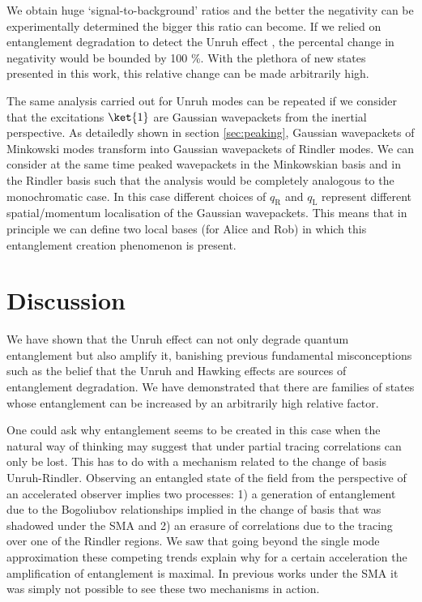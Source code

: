 We obtain huge `signal-to-background' ratios and the better the negativity can be experimentally determined the bigger this ratio can become. If we relied on entanglement degradation to detect the Unruh effect \cite{Alicefalls}, the percental change in negativity would be bounded by 100 \%. With the plethora of new states presented in this work, this relative change can be made arbitrarily high.


The same analysis carried out for Unruh modes can be repeated if we consider that the excitations $\ket{1}$ are Gaussian wavepackets from the inertial perspective. As detailedly shown in section \ref{sec:peaking}, Gaussian wavepackets of Minkowski modes transform into Gaussian wavepackets of Rindler modes. We can consider at the same time peaked wavepackets in the Minkowskian basis and in the Rindler basis such that the analysis would be completely analogous to the monochromatic case. In this case different choices of $q_\text{R}$ and $q_\text{L}$ represent different spatial/momentum localisation of the Gaussian wavepackets. This means that in principle we can define two local bases (for Alice and Rob) in which this entanglement creation phenomenon is present.


\section{Discussion}

We have shown that the Unruh effect can not only degrade quantum entanglement but also amplify it, banishing previous fundamental misconceptions such as the belief that the Unruh and Hawking effects are sources of entanglement degradation. We have demonstrated that there are families of states whose entanglement can be increased by an arbitrarily high relative factor.

 One could ask why entanglement seems to be created in this case when the natural way of thinking may suggest that under partial tracing correlations can only be lost. This has to do with a mechanism related to the change of basis Unruh-Rindler.  Observing an entangled state of the field from the perspective of an accelerated observer implies two processes: 1) a generation of entanglement due to the Bogoliubov relationships implied in the change of basis that was shadowed under the SMA and 2) an erasure of correlations due to the tracing over one of the Rindler regions. We saw that going beyond the single mode approximation these competing trends explain why for a certain acceleration the amplification of entanglement is maximal. In previous works under the SMA it was simply not possible to see these two mechanisms in action.


